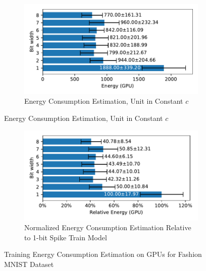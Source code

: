         \begin{figure}[H]
            \centering
            \begin{subfigure}[H]{\textwidth}
                \includegraphics[width=\textwidth]{../standard/FashionMNIST/plots/fashionmnist_train_energy_gpu_horizontal.pdf}
                \caption{Energy Consumption Estimation, Unit in Constant $c$}
            \end{subfigure}
        \end{figure}
        \begin{figure}[H]
            \centering
            \ContinuedFloat
            \begin{subfigure}[H]{\textwidth}
                \includegraphics[width=\textwidth]{../standard/FashionMNIST/plots/fashionmnist_train_relative_energy_gpu_horizontal.pdf}
                \caption{Normalized Energy Consumption Estimation Relative to 1-bit Spike Train Model}
            \end{subfigure}
            \caption{Training Energy Consumption Estimation on GPUs for Fashion MNIST Dataset}
        \end{figure}

    \label{appendix:energy_gpu_mnist}


